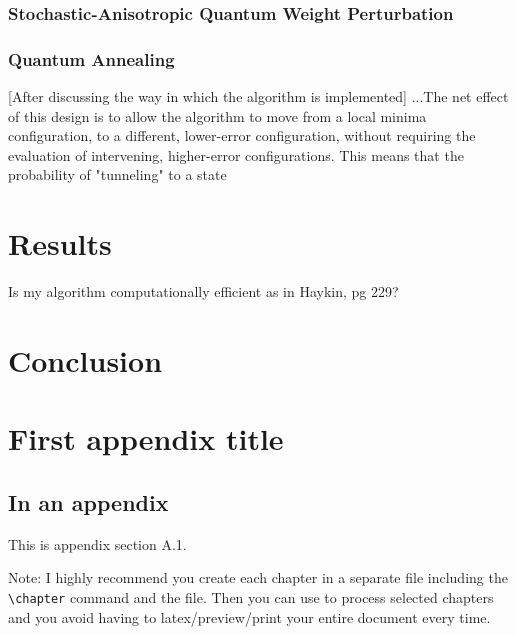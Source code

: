 \documentclass[11pt]{afthesis}
\begin{document}

\subsection{Stochastic-Anisotropic Quantum Weight Perturbation}



\subsection{Quantum Annealing}


[After discussing the way in which the algorithm is implemented] ...The net effect of this design is to allow the algorithm to move from a local minima configuration, to a different, lower-error configuration, without requiring the evaluation of intervening, higher-error configurations. This means that the probability of "tunneling" to a state




\chapter{Results}

Is my algorithm computationally efficient as in Haykin, pg 229?
\chapter{Conclusion}


\appendix		%

\chapter{First appendix title}

\section{In an appendix} 

This is appendix section A.1.

Note: I highly recommend you create each chapter in a separate file
including the \verb|\chapter| command and \verb|| the file.
Then you can use \verb|| to process selected chapters and
you avoid having to latex/preview/print your entire document every
time.
\end{document}
